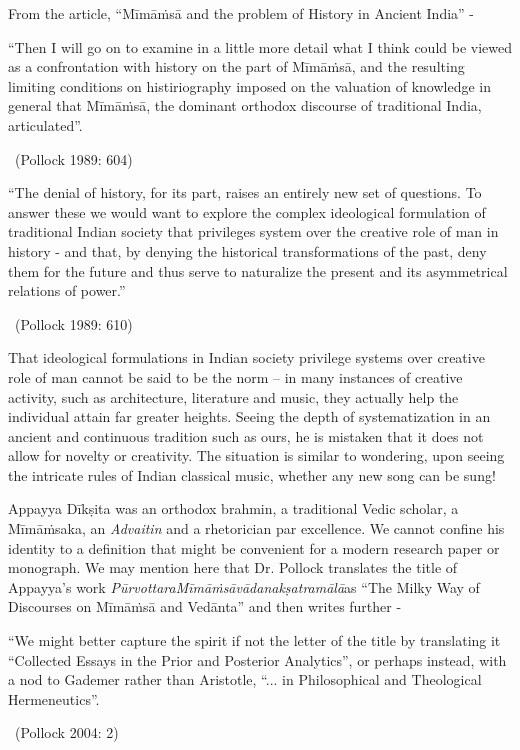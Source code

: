 From the article, “Mīmāṁsā and the problem of History in Ancient India” - 

\newpage

\begin{myquote}
“Then I will go on to examine in a little more detail what I think could be viewed as a confrontation with history on the part of Mīmāṁsā, and the resulting limiting conditions on histiriography imposed on the valuation of knowledge in general that Mīmāṁsā, the dominant orthodox discourse of traditional India, articulated”. 

~\hfill (Pollock 1989: 604)
\end{myquote}

\begin{myquote}
“The denial of history, for its part, raises an entirely new set of questions. To answer these we would want to explore the complex ideological formulation of traditional Indian society that privileges system over the creative role of man in history - and that, by denying the historical transformations of the past, deny them for the future and thus serve to naturalize the present and its asymmetrical relations of power.” 

~\hfill (Pollock 1989: 610)
\end{myquote}

That ideological formulations in Indian society privilege systems over creative role of man cannot be said to be the norm – in many instances of creative activity, such as architecture, literature and music, they actually help the individual attain far greater heights. Seeing the depth of systematization in an ancient and continuous tradition such as ours, he is mistaken that it does not allow for novelty or creativity. The situation is similar to wondering, upon seeing the intricate rules of Indian classical music, whether any new song can be sung! 

Appayya Dīkṣita was an orthodox brahmin, a traditional Vedic scholar, a Mīmāṁsaka, an \textit{Advaitin} and a rhetorician par excellence. We cannot confine his identity to a definition that might be convenient for a modern research paper or monograph. We may mention here that Dr. Pollock translates the title of Appayya’s work \textit{PūrvottaraMīmāṁsāvādanakṣatramālā}as “The Milky Way of Discourses on Mīmāṁsā and Vedānta” and then writes further -

\begin{myquote}
“We might better capture the spirit if not the letter of the title by translating it “Collected Essays in the Prior and Posterior Analytics”, or perhaps instead, with a nod to Gademer rather than Aristotle, “... in Philosophical and Theological Hermeneutics”. 

~\hfill (Pollock 2004: 2)
\end{myquote}

